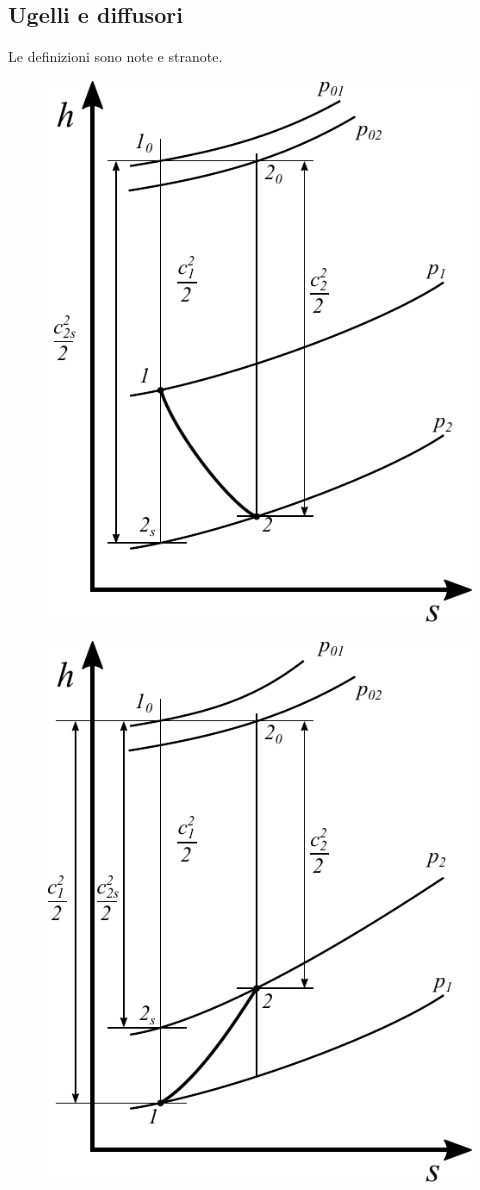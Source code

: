 \subsection{Ugelli e diffusori}
Le definizioni sono note e stranote.
\begin{figure}
\centering
\begin{minipage}{.5\textwidth}
  \centering
  \includegraphics[width=.6\linewidth]{fig/Ugello.pdf}
  \label{}
\end{minipage}%
\begin{minipage}{.5\textwidth}
  \centering
  \includegraphics[width=.6\linewidth]{fig/Diffusore.pdf}
  \label{}
\end{minipage}
\end{figure}
